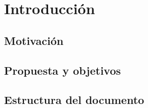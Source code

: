 \chapter{Introducción}\label{chap:introduccion}

\section{Motivación}

\section{Propuesta y objetivos}

\section{Estructura del documento}

